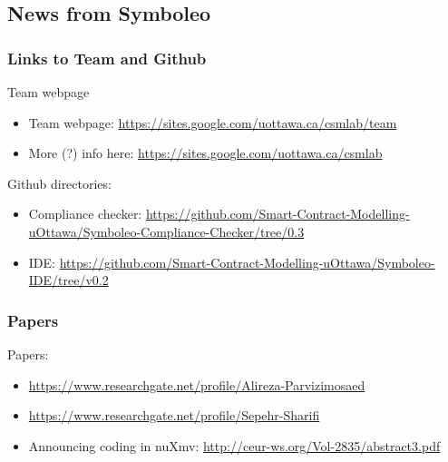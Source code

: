 \documentclass{beamer}
\begin{document}
\subsection{News from Symboleo}


\begin{frame}[fragile]\frametitle{Links to Team and Github}


Team webpage
\begin{itemize}
\item Team webpage: \url{https://sites.google.com/uottawa.ca/csmlab/team}
\item More (?) info here: \url{https://sites.google.com/uottawa.ca/csmlab}
\end{itemize}

Github directories:
\begin{itemize}
\item Compliance checker:
\url{https://github.com/Smart-Contract-Modelling-uOttawa/Symboleo-Compliance-Checker/tree/0.3}
\item IDE:
\url{https://github.com/Smart-Contract-Modelling-uOttawa/Symboleo-IDE/tree/v0.2}
\end{itemize}

\end{frame}


\begin{frame}[fragile]\frametitle{Papers}


Papers:
\begin{itemize}
\item \url{https://www.researchgate.net/profile/Alireza-Parvizimosaed}
\item \url{https://www.researchgate.net/profile/Sepehr-Sharifi}
\item Announcing coding in nuXmv: \url{http://ceur-ws.org/Vol-2835/abstract3.pdf}
\end{itemize}


\end{frame}



\end{document}
